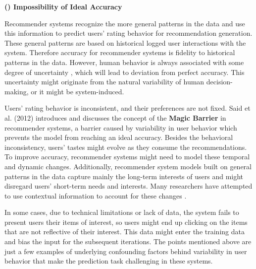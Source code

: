 \vspace{0.25cm}
\noindent \textbf{() Impossibility of Ideal Accuracy}
\vspace{0.25cm}

Recommender systems recognize the more general patterns in the data and use this information to predict users' rating behavior for recommendation generation. These general patterns are based on historical logged user interactions with the system. Therefore accuracy for recommender systems is fidelity to historical patterns in the data. However, human behavior is always associated with some degree of uncertainty \cite{hill1995recommending}, which will lead to deviation from perfect accuracy. This uncertainty might originate from the natural variability of human decision-making, or it might be system-induced.


Users' rating behavior is inconsistent, and their preferences are not fixed. Said et al. (2012) \cite{Said2012MagicBarrier} introduces and discusses the concept of the \textbf{Magic Barrier} in recommender systems, a barrier caused by variability in user behavior which prevents the model from reaching an ideal accuracy. Besides the behavioral inconsistency, users' tastes might evolve \cite{McAuley2013expertise} as they consume the recommendations. To improve accuracy, recommender systems might need to model these temporal and dynamic changes. Additionally, recommender system models built on general patterns in the data capture mainly the long-term interests of users and might disregard users' short-term needs and interests. Many researchers have attempted to use contextual information to account for these changes \cite{Adomavicius2011context}.

In some cases, due to technical limitations or lack of data, the system fails to present users their items of interest, so users might end up clicking on the items that are not reflective of their interest. This data might enter the training data and bias the input for the subsequent iterations. The points mentioned above are just a few examples of underlying confounding factors behind variability in user behavior that make the prediction task challenging in these systems.

